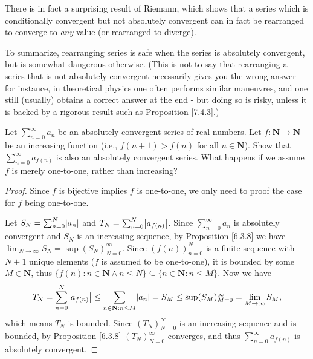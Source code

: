 \begin{note}
    There is in fact a surprising result of Riemann, which shows that a series which is conditionally convergent but not absolutely convergent can in fact be rearranged to converge to \emph{any} value
    (or rearranged to diverge).
\end{note}

\begin{note}
    To summarize, rearranging series is safe when the series is absolutely convergent, but is somewhat dangerous otherwise.
    (This is not to say that rearranging a series that is not absolutely convergent necessarily gives you the wrong answer
    - for instance, in theoretical physics one often performs similar maneuvres, and one still (usually) obtains a correct answer at the end
    - but doing so is risky, unless it is backed by a rigorous result such as Proposition \ref{7.4.3}.)
\end{note}

\exercisesection

\begin{exercise}\label{ex 7.4.1}
    Let \(\sum_{n = 0}^\infty a_n\) be an absolutely convergent series of real numbers.
    Let \(f : \mathbf{N} \to \mathbf{N}\) be an increasing function (i.e., \(f(n + 1) > f(n)\) for all \(n \in \mathbf{N}\)).
    Show that \(\sum_{n = 0}^\infty a_{f(n)}\) is also an absolutely convergent series.
    What happens if we assume \(f\) is merely one-to-one, rather than increasing?
\end{exercise}

\begin{proof}
    Since \(f\) is bijective implies \(f\) is one-to-one, we only need to proof the case for \(f\) being one-to-one.

    Let \(S_N = \sum_{n = 0}^N \abs*{a_n}\) and \(T_N = \sum_{n = 0}^N \abs*{a_{f(n)}}\).
    Since \(\sum_{n = 0}^\infty a_n\) is absolutely convergent and \(S_N\) is an increasing sequence, by Proposition \ref{6.3.8} we have \(\lim_{N \to \infty} S_N = \sup(S_N)_{N = 0}^\infty\).
    Since \((f(n))_{n = 0}^N\) is a finite sequence with \(N + 1\) unique elements (\(f\) is assumed to be one-to-one), it is bounded by some \(M \in \mathbf{N}\), thus \(\{f(n) : n \in \mathbf{N} \land n \leq N\} \subseteq \{n \in \mathbf{N} : n \leq M\}\).
    Now we have
    \[
        T_N = \sum_{n = 0}^N \abs*{a_{f(n)}} \leq \sum_{n \in \mathbf{N} : n \leq M} \abs*{a_n} = S_M \leq \sup(S_M)_{M = 0}^\infty = \lim_{M \to \infty} S_M,
    \]
    which means \(T_N\) is bounded.
    Since \((T_N)_{N = 0}^\infty\) is an increasing sequence and is bounded, by Proposition \ref{6.3.8} \((T_N)_{N = 0}^\infty\) converges, and thus \(\sum_{n = 0}^\infty a_{f(n)}\) is absolutely convergent.
\end{proof}


